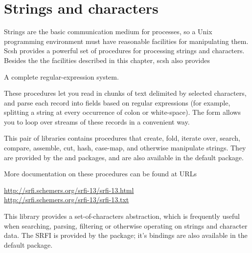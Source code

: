 \chapter{Strings and characters}

Strings are the basic communication medium for {\Unix} processes, so a
Unix programming environment must have reasonable facilities for manipulating 
them.
Scsh provides a powerful set of procedures for processing strings and
characters.
Besides the the facilities described in this chapter, scsh also provides
\begin{itemize}
   A complete regular-expression system.

   These procedures let you read in chunks of text delimited by selected 
   characters, and
   parse each record into fields based on regular expressions
   (for example, splitting a string at every occurrence of colon or
    white-space).
   The  form allows you to loop over streams of these records 
   in a convenient way.

   This pair of libraries contains procedures that create, fold, iterate over,
   search, compare, assemble, cut, hash, case-map, and otherwise manipulate 
   strings. 
   They are provided by the  and  
   packages, and are also available in the default  package.

   More documentation on these procedures can be found at URLs
   \begin{tightinset}
   \texonly
   \mbox{\url{http://srfi.schemers.org/srfi-13/srfi-13.html}}\\
   \url{http://srfi.schemers.org/srfi-13/srfi-13.txt}
   \endtexonly
   \htmlonly
   \\
   \endhtmlonly
   \end{tightinset}

   This library provides a set-of-characters abstraction, which is frequently
   useful when searching, parsing, filtering or otherwise operating on
   strings and character data. The SRFI is provided by the 
   package; it's bindings are also available in the default  package.


\end{itemize}

